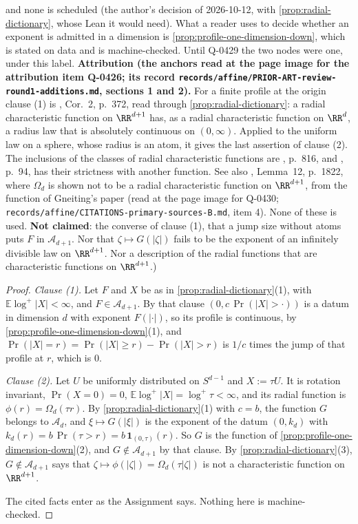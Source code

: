 \begin{theorem}
{and none is scheduled (the author's decision of 2026-10-12, with \ref{prop:radial-dictionary},
whose Lean it would need). What a reader uses to decide whether an exponent is admitted in a
dimension is \ref{prop:profile-one-dimension-down}, which is stated on data and is
machine-checked. Until Q-0429 the two nodes were one, under this label. \textbf{Attribution (the
anchors read
at the page image for the attribution item Q-0426; its record
\texttt{records/affine/PRIOR-ART-review-round1-additions.md}, sections 1 and 2).} For a finite
profile at the origin clause (1) is , Cor.~2, p.~372, read
through \ref{prop:radial-dictionary}: a radial characteristic function on $\RR^{d+1}$ has, as a
radial characteristic function on $\RR^d$, a radius law that is absolutely continuous on
$(0,\infty)$. Applied to the uniform law on a sphere, whose radius is an atom, it gives the last
assertion of clause (2). The inclusions of the classes of radial characteristic functions
are , p.~816, and , p.~94, has their
strictness with another function. See also , Lemma~12, p.~1822,
where $\Omega_d$ is shown not to be a radial characteristic function on $\RR^{d+1}$, from the
function of Gneiting's paper (read at the page image for Q-0430;
\texttt{records/affine/CITATIONS-primary-sources-B.md}, item 4). None of these is used.
\textbf{Not claimed}: the converse of clause (1), that a jump size without atoms puts $F$ in
$\mathcal{A}_{d+1}$. Nor that $\zeta \mapsto G(|\zeta|)$ fails to be the exponent of an
infinitely divisible law on $\RR^{d+1}$. Nor a description of the radial functions that are
characteristic functions on $\RR^{d+1}$.)}
\end{theorem}

\begin{proof}
\emph{Clause (1).} Let $F$ and $X$ be as in
\ref{prop:radial-dictionary}(1), with $\mathbb{E}\log^+|X| < \infty$, and
$F \in \mathcal{A}_{d+1}$. By that clause
$(0, c\,\Pr(|X| > \cdot))$ is a datum in dimension $d$ with exponent $F(|\cdot|)$, so its profile
is continuous, by \ref{prop:profile-one-dimension-down}(1), and
$\Pr(|X| = r) = \Pr(|X| \ge r) - \Pr(|X| > r)$ is $1/c$ times the jump of
that profile at $r$, which is $0$.

\emph{Clause (2).} Let $U$ be uniformly distributed on $S^{d-1}$ and $X := \tau U$. It is
rotation invariant, $\Pr(X = 0) = 0$, $\mathbb{E}\log^+|X| = \log^+\tau < \infty$, and its radial
function is $\phi(r) = \Omega_d(\tau r)$. By \ref{prop:radial-dictionary}(1) with $c = b$, the
function $G$ belongs to $\mathcal{A}_d$, and $\xi \mapsto G(|\xi|)$ is the exponent of the datum
$(0,k_d)$ with $k_d(r) = b\,\Pr(\tau > r) = b\,\mathbf 1_{(0,\tau)}(r)$. So $G$ is the function
of \ref{prop:profile-one-dimension-down}(2), and $G \notin \mathcal{A}_{d+1}$ by that clause. By
\ref{prop:radial-dictionary}(3), $G \notin \mathcal{A}_{d+1}$ says that
$\zeta \mapsto \phi(|\zeta|) = \Omega_d(\tau|\zeta|)$ is not a characteristic function on
$\RR^{d+1}$.

The cited facts enter as the Assignment says. Nothing here is machine-checked.
\end{proof}

